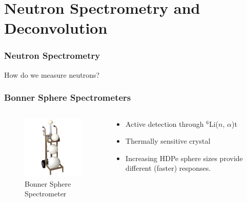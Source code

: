 \documentclass[fleqn]{beamer}
\begin{document}
\section{Neutron Spectrometry and Deconvolution}
\begin{frame}
\frametitle{Neutron Spectrometry}

How do we measure neutrons?

\end{frame}

\begin{frame}
\frametitle{Bonner Sphere Spectrometers}
\begin{columns}[c]
\begin{column}{.5\textwidth}
\begin{figure}
\includegraphics[width=\textwidth]{bss}
\caption{Bonner Sphere Spectrometer}
\end{figure}
\end{column}
\begin{column}{.5\textwidth}
\begin{itemize}
\item Active detection through $^6$Li($n$, $\alpha$)t
\item Thermally sensitive crystal
\item Increasing HDPe sphere sizes provide different (faster) responses.
\end{itemize}
\end{column}
\end{columns}
\end{frame}
\end{document}

